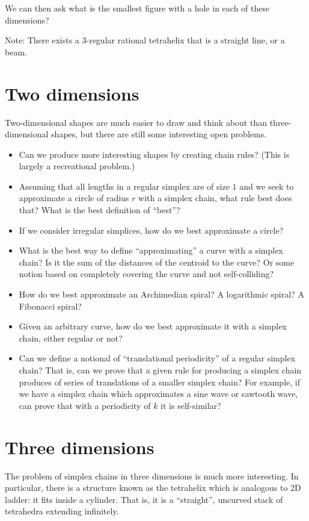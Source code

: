 \documentclass[11pt]{article}
\begin{document}
We can then ask what is the smallest figure with a hole in each of these dimensions?

Note: There exists a 3-regular rational tetrahelix that is a straight line, or a beam.


\section{Two dimensions}

Two-dimensional shapes are much easier to draw and think about than three-dimensional shapes, but there are still
some interesting open problems.

\begin{itemize}
\item Can we produce more interesting shapes by creating chain rules? (This is largely a recreational problem.)
\item Assuming that all lengths in a regular simplex are of size $1$ and we seek to approximate a circle of radius $r$ with a simplex chain,
  what rule best does that?  What is the best definition of ``best''?
\item If we consider irregular simplices, how do we best approximate a circle?
\item What is the best way to define ``approximating'' a curve with a simplex chain? Is it the sum of the distances of the centroid to the curve?
  Or some notion based on completely covering the curve and not self-colliding?
\item How do we best approximate an Archimedian spiral? A logarithmic spiral? A Fibonacci spiral?
\item Given an arbitrary curve, how do we best approximate it with a simplex chain, either regular or not?
\item Can we define a notional of ``translational periodicity'' of a regular simplex chain? That is, can we prove that
  a given rule for producing a simplex chain produces of series of translations of a smaller simplex chain? For example,
  if we have a simplex chain which approximates a sine wave or sawtooth wave, can prove that with a periodicity of $k$ it
  is self-similar?
\end{itemize}

\section{Three dimensions}

The problem of simplex chains in three dimensions is much more interesting. In particular, there is a structure known as the
tetrahelix which is analogous to 2D ladder: it fits inside a cylinder. That is, it is a ``straight'', uncurved stack
of tetrahedra extending infinitely.
\end{document}
